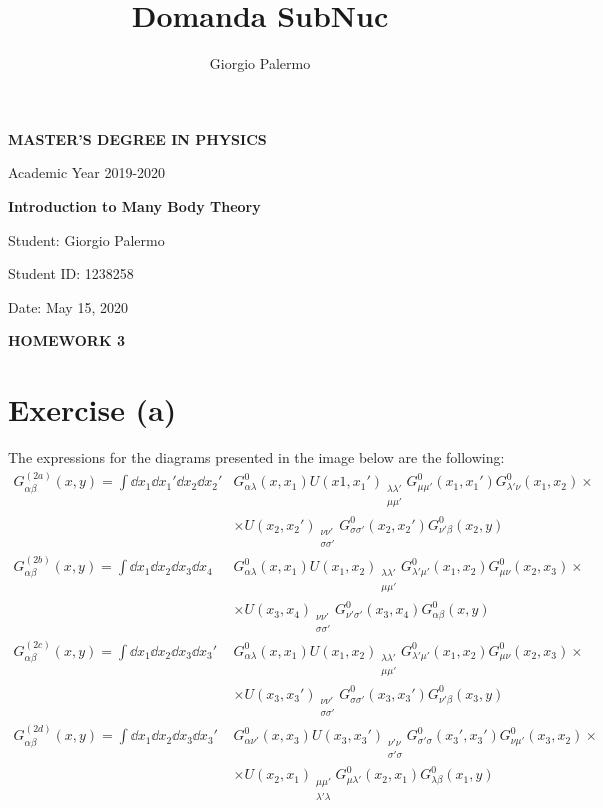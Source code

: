 \documentclass[a4paper]{article}
\title{Domanda SubNuc}
\author{Giorgio Palermo}
\begin{document}
\hypersetup{linkcolor = black}
\hypersetup{linkcolor = blue}

\begin{center}
    \textbf{MASTER'S DEGREE IN PHYSICS}
    
    Academic Year 2019-2020
    
    \medskip
    \textbf{Introduction to Many Body Theory}
\end{center}

\vspace{0.8cm}
Student: Giorgio Palermo

Student ID: 1238258

Date: May 15, 2020

\bigskip

\begin{center}
\textbf{HOMEWORK 3}
\end{center}


\section*{Exercise (a)}
The expressions for the diagrams presented in the image below are the following:
\begin{align*}
G^{(2a)}_{\alpha\beta}(x,y) = \int \dd{x_1}\dd{x_1'}\dd{x_2}\dd{x_2'} &G^0_{\alpha\lambda}(x,x_1)U(x1,x_1')_{\substack{\lambda\lambda'\\ \mu\mu'}}G^0_{\mu\mu'}(x_1,x_1')G^0_{\lambda'\nu}(x_1,x_2)\times \\
&\times U(x_2,x_2')_{\substack{\nu\nu'\\ \sigma\sigma'}}G^0_{\sigma\sigma'}(x_2,x_2') G^0_{\nu'\beta}(x_2,y)\\
G^{(2b)}_{\alpha\beta}(x,y) = \int \dd{x_1}\dd{x_2}\dd{x_3}\dd{x_4} &G^0_{\alpha\lambda}(x,x_1)U(x_1,x_2)_{\substack{\lambda\lambda'\\ \mu\mu'}} G^0_{\lambda'\mu'}(x_1,x_2) G^0_{\mu\nu}(x_2,x_3) \times \\
&\times U(x_3,x_4)_{\substack{\nu\nu'\\ \sigma\sigma'}}G^0_{\nu'\sigma'}(x_3,x_4)G^0_{\alpha\beta}(x,y)\\
G^{(2c)}_{\alpha\beta}(x,y) = \int \dd{x_1}\dd{x_2}\dd{x_3}\dd{x_3'} &G^0_{\alpha\lambda}(x,x_1) U(x_1,x_2)_{\substack{\lambda\lambda'\\ \mu\mu'}} G^0_{\lambda'\mu'}(x_1,x_2) G^0_{\mu\nu}(x_2,x_3)\times\\
&\times U(x_3,x_3')_{\substack{\nu\nu'\\\sigma\sigma'}} G^0_{\sigma\sigma'}(x_3,x_3') G^0_{\nu'\beta}(x_3,y)\\
G^{(2d)}_{\alpha\beta}(x,y) = \int \dd{x_1}\dd{x_2}\dd{x_3}\dd{x_3'} &G^0_{\alpha\nu'}(x,x_3) U(x_3,x_3')_{\substack{\nu'\nu\\ \sigma'\sigma}} G^0_{\sigma'\sigma}(x_3',x_3') G^0_{\nu\mu'}(x_3,x_2) \times \\
&\times U(x_2,x_1)_{\substack{\mu\mu' \\ \lambda'\lambda}}  G^0_{\mu\lambda'}(x_2,x_1) G^0_{\lambda\beta}(x_1,y)
\end{align*}
\end{document}
